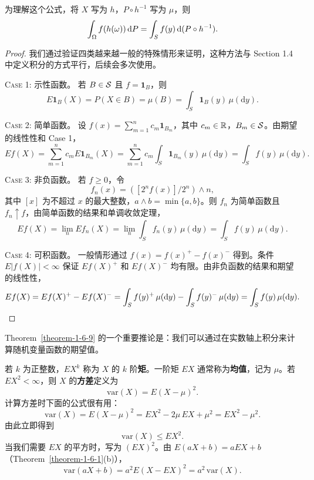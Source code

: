 \begin{remark*}
    为理解这个公式，将 $X$ 写为 $h$，$P \circ h^{-1}$ 写为 $\mu$，则
    \[
        \int_\Omega f(h(\omega)) \,\mathrm{d} P = \int_S f(y) \,\mathrm{d}(P \circ h^{-1}).
    \]
\end{remark*}

\begin{proof}
    我们通过验证四类越来越一般的特殊情形来证明，这种方法与 Section 1.4 中定义积分的方式平行，后续会多次使用。

    \textsc{Case 1: 示性函数。} 若 $B \in \mathcal{S}$ 且 $f = \mathbf{1}_B$，则
    \[
        E\mathbf{1}_B(X) = P(X \in B) = \mu(B) = \int_S \mathbf{1}_B(y) \, \mu(\mathrm{d}y).
    \]

    \textsc{Case 2: 简单函数。} 设 $f(x) = \sum_{m=1}^n c_m \mathbf{1}_{B_m}$，其中 $c_m \in \mathbb{R}$，$B_m \in \mathcal{S}$。由期望的线性性和 Case 1，
    \[
        Ef(X) = \sum_{m=1}^n c_m E\mathbf{1}_{B_m}(X) = \sum_{m=1}^n c_m \int_S \mathbf{1}_{B_m}(y) \, \mu(\mathrm{d}y) = \int_S f(y) \, \mu(\mathrm{d}y).
    \]

    \textsc{Case 3: 非负函数。} 若 $f \ge 0$，令
    \[
        f_n(x) = ([2^n f(x)] / 2^n) \wedge n,
    \]
    其中 $[x]$ 为不超过 $x$ 的最大整数，$a \wedge b = \min\{a, b\}$。则 $f_n$ 为简单函数且 $f_n \uparrow f$，由简单函数的结果和单调收敛定理，
    \[
        Ef(X) = \lim_n Ef_n(X) = \lim_n \int_S f_n(y) \, \mu(\mathrm{d}y) = \int_S f(y) \, \mu(\mathrm{d}y).
    \]

    \textsc{Case 4: 可积函数。} 一般情形通过 $f(x) = f(x)^+ - f(x)^-$ 得到。条件 $E|f(X)| < \infty$ 保证 $Ef(X)^+$ 和 $Ef(X)^-$ 均有限。由非负函数的结果和期望的线性性，
    \[
        Ef(X) = Ef(X)^+ - Ef(X)^- = \int_S f(y)^+ \, \mu(\mathrm{d}y) - \int_S f(y)^- \, \mu(\mathrm{d}y) = \int_S f(y) \, \mu(\mathrm{d}y). \qedhere
    \]
\end{proof}

Theorem~\ref{theorem-1-6-9} 的一个重要推论是：我们可以通过在实数轴上积分来计算随机变量函数的期望值。

若 $k$ 为正整数，$EX^k$ 称为 $X$ 的 $k$ 阶\textbf{矩}。一阶矩 $EX$ 通常称为\textbf{均值}，记为 $\mu$。若 $EX^2 < \infty$，则 $X$ 的\textbf{方差}定义为
\[
    \mathrm{var}(X) = E(X - \mu)^2.
\]
计算方差时下面的公式很有用：
\begin{equation}\label{eq-1-6-2}
    \mathrm{var}(X) = E(X - \mu)^2 = EX^2 - 2\mu \, EX + \mu^2 = EX^2 - \mu^2.
\end{equation}
由此立即得到
\begin{equation}\label{eq-1-6-3}
    \mathrm{var}(X) \le EX^2.
\end{equation}
当我们需要 $EX$ 的平方时，写为 $(EX)^2$。由 $E(aX + b) = aEX + b$（Theorem~\ref{theorem-1-6-1}(b)），
\begin{equation}\label{eq-1-6-4}
    \mathrm{var}(aX + b) = a^2 E(X - EX)^2 = a^2 \, \mathrm{var}(X).
\end{equation}


